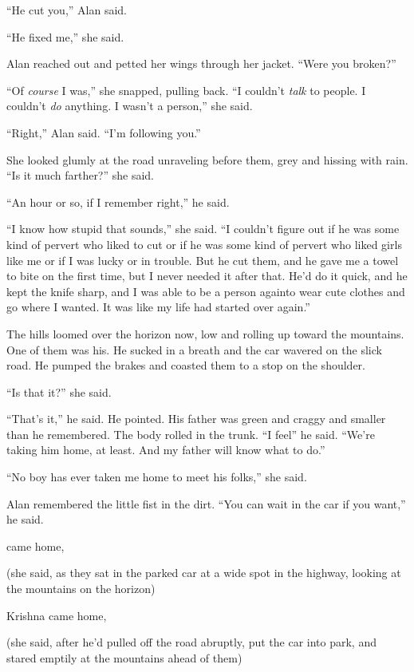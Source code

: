``He cut you,'' Alan said.

``He fixed me,'' she said.

Alan reached out and petted her wings through her jacket.  ``Were you
broken?''

``Of \textit{course} I was,'' she snapped, pulling back.  ``I couldn't
\textit{talk} to people.  I couldn't \textit{do} anything.  I wasn't a
person,'' she said.

``Right,'' Alan said.  ``I'm following you.''

She looked glumly at the road unraveling before them, grey and hissing
with rain.  ``Is it much farther?'' she said.

``An hour or so, if I remember right,'' he said.

``I know how stupid that sounds,'' she said.  ``I couldn't figure out
if he was some kind of pervert who liked to cut or if he was some kind
of pervert who liked girls like me or if I was lucky or in trouble. 
But he cut them, and he gave me a towel to bite on the first time, but
I never needed it after that.  He'd do it quick, and he kept the knife
sharp, and I was able to be a person again\dash{}to wear cute clothes and
go where I wanted.  It was like my life had started over again.''

The hills loomed over the horizon now, low and rolling up toward the
mountains.  One of them was his.  He sucked in a breath and the car
wavered on the slick road.  He pumped the brakes and coasted them to a
stop on the shoulder.

``Is that it?'' she said.

``That's it,'' he said.  He pointed.  His father was green and craggy
and smaller than he remembered.  The body rolled in the trunk.  ``I
feel\dash{}'' he said.  ``We're taking him home, at least.  And my father
will know what to do.''

``No boy has ever taken me home to meet his folks,'' she said.

Alan remembered the little fist in the dirt.  ``You can wait in the
car if you want,'' he said.

 came home,

(she said, as they sat in the parked car at a wide spot in the
highway, looking at the mountains on the horizon)

Krishna came home,

(she said, after he'd pulled off the road abruptly, put the car into
park, and stared emptily at the mountains ahead of them)

